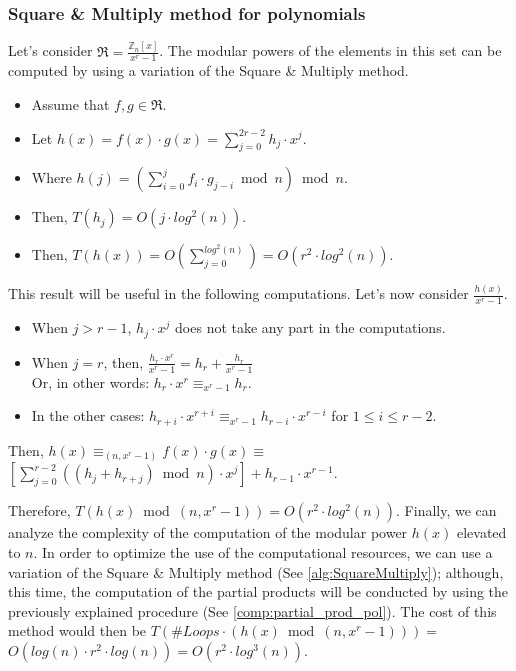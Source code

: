 \subsubsection{Square \& Multiply method for polynomials}
Let's consider $\Re = \frac{\mathbb{Z}_{n}[x]}{x^{r} - 1}$. The modular powers of the elements in this set can be computed by using a variation of the Square \& Multiply method. \newline
\begin{itemize}
    \item Assume that $f, g \in \Re$.
    \item Let $h(x) = f(x) \cdot g(x) = \sum_{j = 0}^{2r - 2} h_{j} \cdot x^{j}$.
    \item Where $h(j) = (\sum_{i=0}^{j} f_{i} \cdot g_{j - i} \bmod n) \bmod n$.
    \item Then, $T(h_{j}) = O(j \cdot log^{2}(n))$.
    \item Then, $T(h(x)) = O(\sum_{j = 0}^{log^{2}(n)}) = O(r^{2} \cdot log^{2}(n))$.
\end{itemize}
This result will be useful in the following computations. \newline
Let's now consider $\frac{h(x)}{x^{r} - 1}$.
\begin{itemize}
    \item When $j > r - 1$, $h_{j} \cdot x^{j}$ does not take any part in the computations.
    \item When $j = r$, then, $\frac{h_{r} \cdot x^{r}}{x^{r} - 1 } = h_{r} + \frac{h_{r}}{x^{r} - 1}$ \\ Or, in other words: $h_{r} \cdot x^{r} \equiv_{x^{r} - 1} h_{r}$.
    \item In the other cases: $h_{r+i} \cdot x^{r+i} \equiv_{x^{r} - 1} h_{r-i} \cdot x^{r-i}$ for $1 \leq i \leq r - 2$.
\end{itemize}
Then, $h(x) \equiv_{(n, x^{r} - 1)} f(x) \cdot g(x) \equiv$ \\ $[\sum_{j=0}^{r - 2}((h_{j} + h_{r + j}) \bmod n) \cdot x^{j}] + h_{r-1} \cdot x^{r-1}$.\label{comp:partial_prod_pol} \newline

Therefore, $T(h(x) \bmod (n, x^{r} - 1)) = O(r^{2} \cdot log^{2}(n))$. \newline
Finally, we can analyze the complexity of the computation of the modular power $h(x)$ elevated to $n$. \newline
In order to optimize the use of the computational resources, we can use a variation of the Square \& Multiply method (See \ref{alg:SquareMultiply});
although, this time, the computation of the partial products will be conducted by using the previously explained procedure (See \ref{comp:partial_prod_pol}). \newline
The cost of this method would then be $T(\#Loops \cdot (h(x) \bmod (n, x^{r} - 1))) =$ \\ $O(log(n) \cdot r^{2} \cdot log(n)) = O(r^{2} \cdot log^{3}(n))$.

